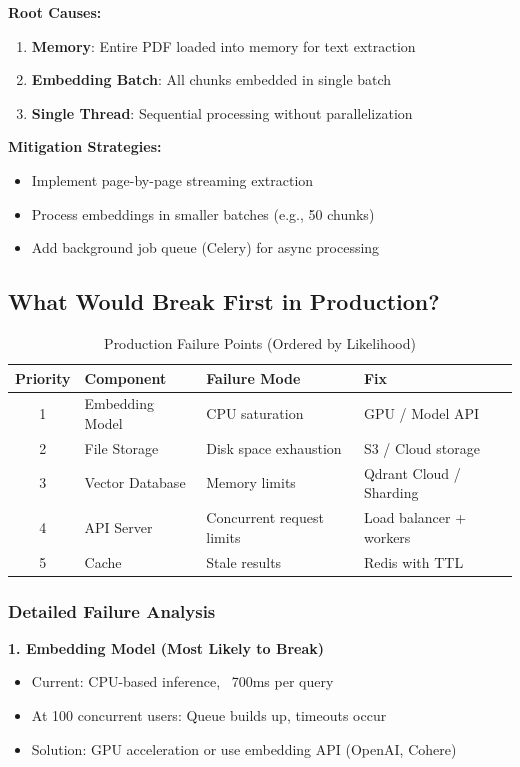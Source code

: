 \documentclass[11pt,a4paper]{article}
\begin{document}
\textbf{Root Causes:}
\begin{enumerate}
    \item \textbf{Memory}: Entire PDF loaded into memory for text extraction
    \item \textbf{Embedding Batch}: All chunks embedded in single batch
    \item \textbf{Single Thread}: Sequential processing without parallelization
\end{enumerate}

\textbf{Mitigation Strategies:}
\begin{itemize}
    \item Implement page-by-page streaming extraction
    \item Process embeddings in smaller batches (e.g., 50 chunks)
    \item Add background job queue (Celery) for async processing
\end{itemize}

\subsection{What Would Break First in Production?}

\begin{table}[H]
\centering
\begin{tabular}{clll}
\toprule
\textbf{Priority} & \textbf{Component} & \textbf{Failure Mode} & \textbf{Fix} \\
\midrule
1 & Embedding Model & CPU saturation & GPU / Model API \\
2 & File Storage & Disk space exhaustion & S3 / Cloud storage \\
3 & Vector Database & Memory limits & Qdrant Cloud / Sharding \\
4 & API Server & Concurrent request limits & Load balancer + workers \\
5 & Cache & Stale results & Redis with TTL \\
\bottomrule
\end{tabular}
\caption{Production Failure Points (Ordered by Likelihood)}
\end{table}

\subsubsection{Detailed Failure Analysis}

\textbf{1. Embedding Model (Most Likely to Break)}
\begin{itemize}
    \item Current: CPU-based inference, ~700ms per query
    \item At 100 concurrent users: Queue builds up, timeouts occur
    \item Solution: GPU acceleration or use embedding API (OpenAI, Cohere)
\end{itemize}
\end{document}
